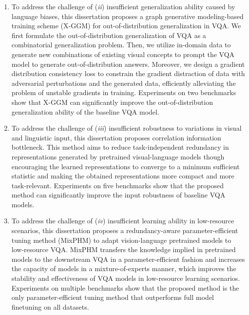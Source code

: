 \begin{englishabstract}
\begin{enumerate}[wide,leftmargin=0pt]
\item To address the challenge of (\emph{ii}) insufficient generalization ability caused by language biases, this dissertation proposes a graph generative modeling-based training scheme (X-GGM) for out-of-distribution generalization in VQA. 
We first formulate the out-of-distribution generalization of VQA as a combinatorial generalization problem. 
Then, we utilize in-domain data to generate new combinations of existing visual concepts to prompt the VQA model to generate out-of-distribution answers. 
Moreover, we design a gradient distribution consistency loss to constrain the gradient distraction of data with adversarial perturbations and the generated data, efficiently alleviating the problem of unstable gradients in training. 
Experiments on two benchmarks show that X-GGM can significantly improve the out-of-distribution generalization ability of the baseline VQA model. 


\item To address the challenge of (\emph{iii}) insufficient robustness to variations in visual and linguistic input, this dissertation proposes correlation information bottleneck. 
This method aims to reduce task-independent redundancy in representations generated by pretrained visual-language models though encouraging the learned representations to converge to a minimum sufficient statistic and making the obtained representations more compact and more task-relevant. 
Experiments on five benchmarks show that the proposed method can significantly improve the input robustness of baseline VQA models. 


\item To address the challenge of (\emph{iv}) insufficient learning ability in low-resource scenarios, this dissertation proposes a redundancy-aware parameter-efficient tuning method (MixPHM) to adapt vision-language pretrained models to low-resource VQA. 
MixPHM transfers the knowledge implied in pretrained models to the downstream VQA in a parameter-efficient fashion and increases the capacity of models in a mixture-of-experts manner, which improves the stability and effectiveness of VQA models in low-resource learning scenarios.  
Experiments on multiple benchmarks show that the proposed method is the only parameter-efficient tuning method that outperforms full model finetuning on all datasets. 

\end{enumerate}
 



\end{englishabstract}
